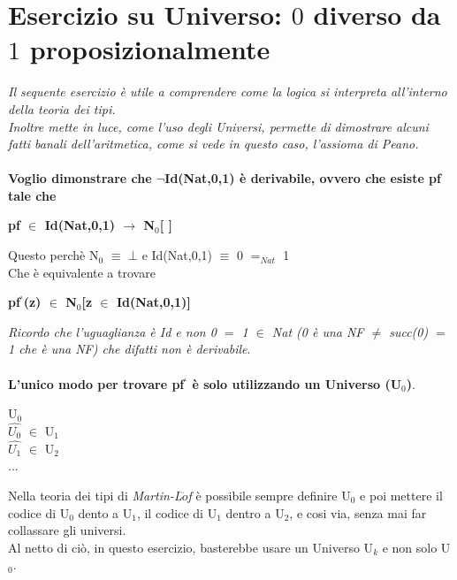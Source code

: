 \section{Esercizio su Universo: $0$ diverso da $1$ proposizionalmente}
\label{sec:esercizio-su-universo}
\textit{Il sequente esercizio \`e utile a comprendere come la logica si interpreta all'interno della teoria dei tipi.\\
Inoltre mette in luce, come l'uso degli Universi, permette di dimostrare alcuni fatti banali dell'aritmetica, come si vede in questo caso, l'assioma di Peano.}\\\\
\noindent
\textbf{Voglio dimonstrare che $\neg$Id(Nat,0,1) \`e derivabile, ovvero che esiste pf tale che} 
\begin{center}\textbf{pf $\in$ Id(Nat,0,1) $\rightarrow$ N$_0$[ ]}\end{center}
Questo perch\`e N$_0$ $\equiv$ $\bot$ e Id(Nat,0,1) $\equiv$ $0$ $=_{Nat}$ 1\\
Che \`e equivalente  a trovare 
\begin{center}\textbf{pf$^\backprime$(z) $\in$ N$_0$[z $\in$ Id(Nat,0,1)]}\end{center}
\noindent \textit{Ricordo che l'uguaglianza \`e Id e non 0 $=$ 1 $\in$ Nat (0 \`e una NF $\neq$ succ(0) $=$ 1 che \`e una NF) che difatti non \`e derivabile}.\\\\
\noindent \textbf{L'unico modo per trovare pf$^\backprime$ \`e solo utilizzando un Universo (U$_0$)}.
\begin{center}
U$_0$\\
$\hat{U_0}$ $\in$ U$_1$\\
$\hat{U_1}$ $\in$ U$_2$\\
...
\end{center}
\noindent
Nella teoria dei tipi di \textit{Martin-L$\ddot{o}$f} \`e possibile sempre definire U$_0$ e poi mettere il codice di U$_0$ dento a U$_1$, il codice di U$_1$ dentro a U$_2$, e cosi via, senza mai far collassare gli universi.\\
Al netto di ci\`o, in questo esercizio, basterebbe usare un Universo U$_k$ e non solo U$_0$.

